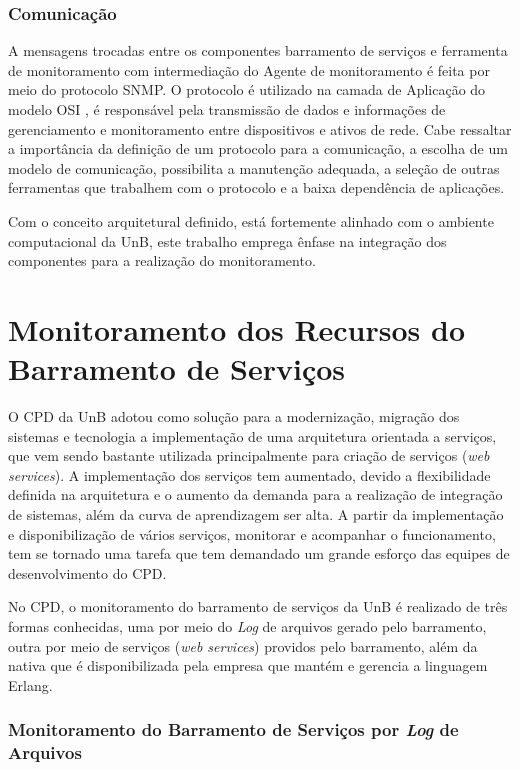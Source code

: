 \subsubsection{Comunicação}

A mensagens trocadas entre os componentes barramento de serviços e ferramenta de monitoramento com intermediação do Agente de monitoramento é feita por meio do protocolo \acrshort{SNMP}. O protocolo é utilizado na camada de Aplicação do modelo OSI \cite{tanenbaum2003redes}, é responsável pela transmissão de dados e informações de gerenciamento e monitoramento entre dispositivos e ativos de rede. Cabe ressaltar a importância da definição de um protocolo para a comunicação, a escolha de um modelo de comunicação, possibilita a manutenção adequada, a seleção de outras ferramentas que trabalhem com o protocolo e a baixa dependência de aplicações.     

Com o conceito arquitetural definido, está fortemente alinhado com o ambiente computacional da \acrshort{UnB}, este trabalho emprega ênfase na integração dos componentes para a realização do monitoramento.   

\section{Monitoramento dos Recursos do Barramento de Serviços}%
\label{recursos_monitoramento}

O \acrshort{CPD} da \acrshort{UnB} adotou como solução para a modernização, migração dos sistemas e tecnologia a implementação de uma arquitetura orientada a serviços, que vem sendo bastante utilizada principalmente para criação de serviços (\textit{web services}). A implementação dos serviços tem aumentado, devido a flexibilidade definida na arquitetura e o aumento da demanda para a realização de integração de sistemas, além da curva de aprendizagem ser alta. A partir da implementação e disponibilização de  vários serviços, monitorar e acompanhar o funcionamento, tem se tornado uma tarefa que tem demandado um grande esforço das equipes de desenvolvimento do \acrshort{CPD}. 

No \acrshort{CPD}, o monitoramento do barramento de serviços da \acrshort{UnB} é realizado de três formas conhecidas, uma por meio do \textit{Log} de arquivos gerado pelo barramento, outra por meio de serviços (\textit{web services}) providos pelo barramento, além da nativa que é disponibilizada pela empresa que mantém e gerencia a linguagem Erlang.

\subsubsection{Monitoramento do Barramento de Serviços por \textit{Log} de Arquivos}

